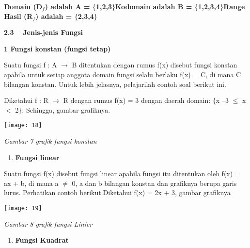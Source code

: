 \documentclass[11pt,fleqn]{book} %
\begin{document}
\noindent 

\noindent \textbf{Domain (D${}_{f}$) adalah A = $\boldsymbol{\{}$1,2,3$\boldsymbol{\}}$Kodomain adalah B = $\boldsymbol{\{}$1,2,3,4$\boldsymbol{\}}$Range Hasil (R${}_{f}$) adalah = $\boldsymbol{\{}$2,3,4$\boldsymbol{\}}$}

\noindent 

\noindent \textbf{2.3 }~~\textbf{Jenis-jenis Fungsi}

\textbf{}

\textbf{1  Fungsi konstan (fungsi tetap)}

\textbf{}

Suatu fungsi f : A $\mathrm{\to}$ B ditentukan dengan rumus f(x) disebut fungsi konstan apabila untuk setiap anggota domain fungsi selalu berlaku f(x) = C, di mana C bilangan konstan. Untuk lebih jelasnya, pelajarilah contoh soal berikut ini.



\noindent Diketahui f : R $\mathrm{\to}$ R dengan rumus f(x) = 3 dengan daerah domain: $\{$x {\textbar} --3 $\mathrm{\le}$ x $<$ 2$\}$. Sehingga, gambar grafiknya.

\begin{center}
\noindent \texttt{[image: 18]}
\end{center}

\textit{Gambar 7 grafik fungsi konstan}

\textit{}

\begin{enumerate}
\item \textit{ }\textbf{\textit{ }Fungsi linear\textit{}}
\end{enumerate}

\noindent Suatu fungsi f(x) disebut fungsi linear apabila fungsi itu ditentukan oleh f(x) = ax + b, di mana a $\mathrm{\neq}$ 0, a dan b bilangan konstan dan grafiknya berupa garis lurus. Perhatikan contoh berikut.Diketahui f(x) = 2x + 3, gambar grafiknya\textit{}

\begin{center}
\noindent \texttt{[image: 19]}
\end{center}

\noindent \textit{Gambar 8 grafik fungsi Linier}

\noindent 

\noindent 

\begin{enumerate}
\item  \textbf{Fungsi Kuadrat}
\end{enumerate}
\end{document}
